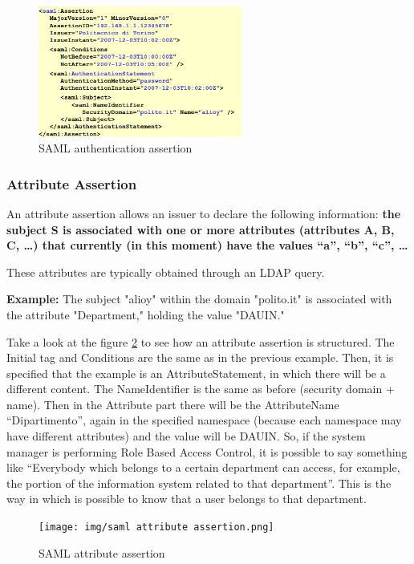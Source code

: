 \begin{figure}[H]
  \centering
  \includegraphics[width=0.6\textwidth]{img/saml auth assertion.png}
  \caption{SAML authentication assertion}
  \label{fig:saml-auth-assertion}
\end{figure}

\subsubsection{Attribute Assertion}

An attribute assertion allows an issuer to declare the following
information: \textbf{the subject S is associated with one or more
  attributes (attributes A, B, C, …) that currently (in this moment)
  have the values “a”, “b”, “c”, … }

\noindent These attributes are typically obtained through an LDAP
query.

\noindent \textbf{Example:} The subject "alioy" within the domain
"polito.it" is associated with the attribute "Department," holding the
value "DAUIN."

Take a look at the figure \ref{fig:saml-attribute-assertion} to see
how an attribute assertion is structured. 
The Initial tag and Conditions are the same as in the previous
example. Then, it is specified that the example is an
AttributeStatement, in which there will be a different content. The
NameIdentifier is the same as before (security domain + name). Then in
the Attribute part there will be the AttributeName “Dipartimento”,
again in the specified namespace (because each namespace may have
different attributes) and the value will be DAUIN. So, if the system
manager is performing Role Based Access Control, it is possible to say
something like “Everybody which belongs to a certain department can
access, for example, the portion of the information system related to
that department”. This is the way in which is possible to know that a
user belongs to that department.

\begin{figure}[H]
  \centering
  \texttt{[image: img/saml attribute
  assertion.png]}
  \caption{SAML attribute assertion}
  \label{fig:saml-attribute-assertion}
\end{figure}

